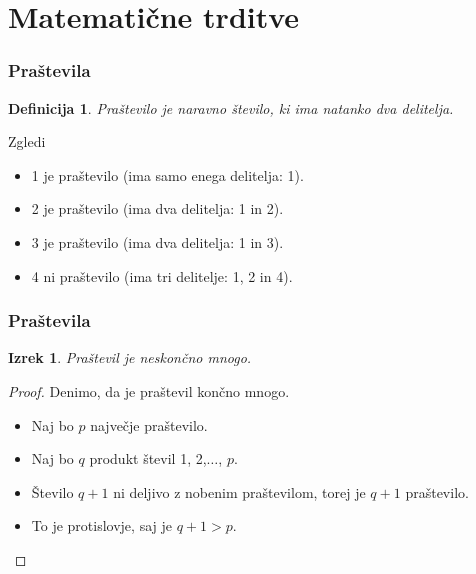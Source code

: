 \documentclass{beamer}
\newtheorem{definicija}{Definicija}
\newtheorem{izrek}{Izrek}
\begin{document}

\section{Matematične trditve}

\begin{frame}
\frametitle{Praštevila}

\begin{definicija}
   
      Praštevilo je naravno število, ki ima natanko dva delitelja.
      \end{definicija}
\begin{exampleblock}{Zgledi}     
   	\begin{itemize}
   	\item
         1 je praštevilo (ima samo enega delitelja: 1).
         \item
         2 je praštevilo (ima dva delitelja: 1 in 2).
         \item
         3 je praštevilo (ima dva delitelja: 1 in 3).
         \item
         4 ni praštevilo (ima tri delitelje: 1, 2 in 4).
         \end{itemize}
\end{exampleblock}
\end{frame}
\begin{frame}
   \frametitle{Praštevila}
   \begin{izrek}
      Praštevil je neskončno mnogo.
      \end{izrek}
      
      \begin{proof}
      Denimo, da je praštevil končno mnogo.
      \begin{itemize}
      \item
         Naj bo $p$ največje praštevilo.
         \item
         Naj bo $q$ produkt števil 1, 2,$\ldots$, $p$.
         \item
         Število $q+1$ ni deljivo z nobenim praštevilom, torej je $q+1$ praštevilo.
         \item
         To je protislovje, saj je $q+1>p$.
         \end{itemize}
         \end{proof}
\end{frame}
\end{document}
